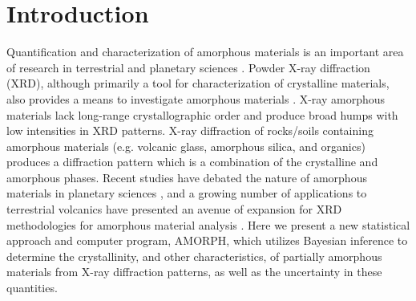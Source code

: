 \documentclass[review]{elsarticle}
\newcommand{\changed}{\color{blue}}
\begin{document}
\section{Introduction}
Quantification and characterization of amorphous materials is an important area of research in
terrestrial and planetary sciences \citep[e.g.,][]{schmidt2009, dehouck2014, wall2014, morris2016, zorn2018}.
Powder X-ray diffraction (XRD), although primarily a tool for characterization of crystalline materials,
also provides a means to investigate amorphous materials \citep[e.g.,][]{rowe2012, achilles2013}. X-ray {\changed amorphous materials lack long-range crystallographic order and produce broad humps with low intensities in XRD patterns. X-ray} diffraction of rocks/soils containing amorphous materials (e.g. volcanic
glass, amorphous silica, and organics) produces a diffraction pattern which is a combination of the
crystalline and amorphous phases. Recent studies have debated the nature of amorphous materials in
planetary sciences \citep[e.g.][]{schmidt2009, dehouck2014}, and a growing number of
applications to terrestrial volcanics have presented an avenue of expansion for XRD methodologies
for amorphous material analysis \citep{ellis2015, kanakiya2017, zorn2018}.
Here we present a new statistical approach and computer program, AMORPH, which utilizes Bayesian inference to determine
the crystallinity, and other characteristics, of partially amorphous materials from X-ray diffraction patterns, as well as the uncertainty in these quantities.
\end{document}
